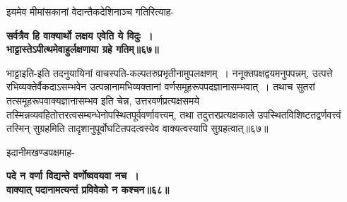 {{{{ इयमेव मीमांसकानां वेदान्तैकदेशिनाञ्च गतिरित्याह-
\begin{center}{\bfseries सर्वत्रैव हि वाक्यार्थो लक्षय एवेति ये विदुः~।\\
 भाट्टास्तेऽपीत्थमेवाहुर्लक्षणाया ग्रहे गतिम्॥६७॥}\end{center}

 भाट्टाइति-इति तदनुयायिनां वाचस्पति-कल्पतरुप्रभृतीनामुपलक्षणम्~।
ननूक्तपक्षद्वयमनुपपन्नम्, उत्पत्ते रभिव्यक्तेर्वैकदाऽसम्भवेन उत्पन्नानामभिव्यक्तानां वर्णसमूहरूपपदज्ञानासम्भवात्~।
तथाच सुतरां तत्समूहरूपवाक्यज्ञानासम्भव इति चेन्न, उत्तरवर्णप्रत्यक्षसमये तस्मिन्नव्यवहितोत्तरत्वसम्बन्धेनोपस्थितपूर्ववर्णावत्त्वम्, तथा तदुत्तरप्रत्यक्षकाले उपस्थितविशिष्टतद्वर्णवत्त्वं तस्मिन् सुग्रहमिति तादृशानुपूर्वोघटितपदत्वस्येव वाक्यत्वस्यापि सुग्रहत्वात्॥६७॥

इदानीमखण्डपक्षमाह-
\begin{center}{\bfseries पदे न वर्णा विद्यन्ते वर्णोष्ववयवा नच~।\\
 वाक्यात् पदानामत्यन्तं प्रविवेको न कश्चन॥६८॥}\end{center}

}}}}
